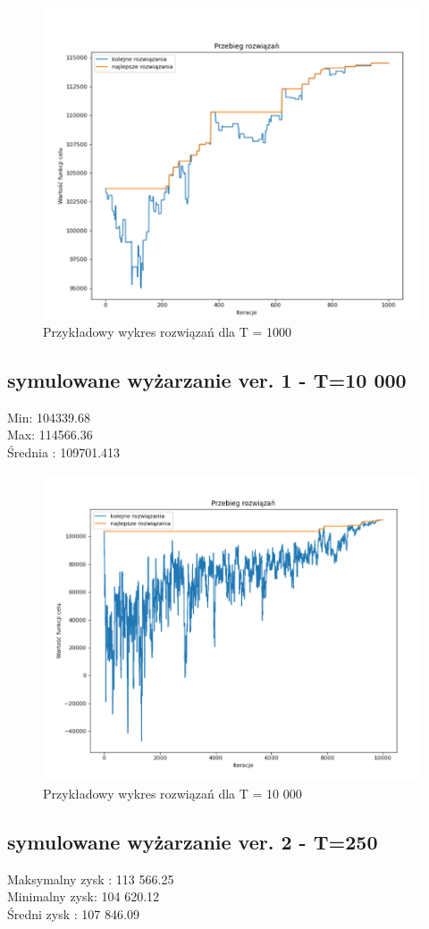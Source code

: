 \documentclass{article}
\begin{document}
\begin{figure}[H]
	\centering
	\includegraphics[width=0.7\linewidth]{screens/AnneallingV1_1000}
	\caption{Przykładowy wykres rozwiązań dla T = 1000}
	\label{fig:anneallingv11000}
\end{figure}

\subsection{symulowane wyżarzanie ver. 1 - T=10 000}
Min: 104339.68\\
Max: 114566.36\\
Średnia : 109701.413\\

\begin{figure}[H]
	\centering
	\includegraphics[width=0.7\linewidth]{screens/annealing_v1_10000}
	\caption{Przykładowy wykres rozwiązań dla T = 10 000}
	\label{fig:annealingv110000}
\end{figure}



\subsection{symulowane wyżarzanie ver. 2 - T=250}
Maksymalny zysk :  113 566.25 \\
Minimalny zysk: 104 620.12 \\
Średni zysk : 107 846.09 \\
\end{document}
